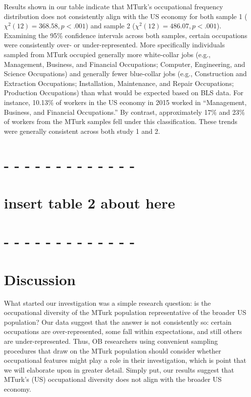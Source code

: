 \documentclass[english,man]{apa6}
\theoremstyle{definition}
\theoremstyle{definition}
\theoremstyle{remark}
\begin{document}
Results shown in our table indicate that MTurk's occupational frequency
distribution does not consistently align with the US economy for both
sample 1 (\(\chi^2(12) = 368.58, p < .001\)) and sample 2
(\(\chi^2(12) = 486.07, p < .001\)). Examining the 95\% confidence
intervals across both samples, certain occupations were consistently
over- or under-represented. More specifically individuals sampled from
MTurk occupied generally more white-collar jobs (e.g., Management,
Business, and Financial Occupations; Computer, Engineering, and Science
Occupations) and generally fewer blue-collar jobs (e.g., Construction
and Extraction Occupations; Installation, Maintenance, and Repair
Occupations; Production Occupations) than what would be expected based
on BLS data. For instance, 10.13\% of workers in the US economy in 2015
worked in \enquote{Management, Business, and Financial Occupations.} By
contrast, approximately 17\% and 23\% of workers from the MTurk samples
fell under this classification. These trends were generally consistent
across both study 1 and 2.

\section{- - - - - - - - - - - - -}\label{section-2}

\section{insert table 2 about here}\label{insert-table-2-about-here}

\section{- - - - - - - - - - - - -}\label{section-3}

\section{Discussion}\label{discussion}

What started our investigation was a simple research question: is the
occupational diversity of the MTurk population representative of the
broader US population? Our data suggest that the answer is not
consistently so: certain occupations are over-represented, some fall
within expectations, and still others are under-represented. Thus, OB
researchers using convenient sampling procedures that draw on the MTurk
population should consider whether occupational features might play a
role in their investigation, which is point that we will elaborate upon
in greater detail. Simply put, our results suggest that MTurk's (US)
occupational diversity does not align with the broader US economy.
\end{document}
